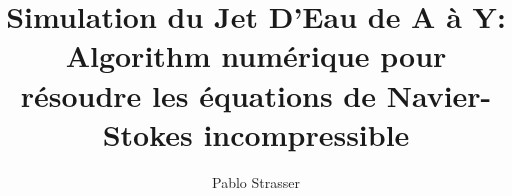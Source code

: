 \usepackage{amsmath,amssymb}
\usepackage{amsthm}


\usepackage{tikz}
\usepackage[francais]{babel}
\usepackage{pgfplots}
\usepackage{pgfplotstable}
\usepackage{subcaption}
%  
\usetikzlibrary{fit}
\usetikzlibrary{backgrounds}
\usetikzlibrary{positioning} 
\usetikzlibrary{shapes.multipart}
\usetikzlibrary{fit}

\newtheorem{property}{Property}

\newcommand{\vect}[1]{ {\boldsymbol {#1}}}
\newcommand{\eye}{1}
\newcommand{\kron}{\bigotimes}

 \beamerdefaultoverlayspecification{<+->}

\newenvironment{plusenv}{\alt{\setbeamertemplate{itemize item}{$\textcolor{green}{\oplus}$}}
{\setbeamertemplate{itemize item}{$\textcolor{gray}{\oplus}$}}}{}
\newenvironment{moinsenv}{\alt{\setbeamertemplate{itemize item}{$\textcolor{red}{\ominus}$}}
{\setbeamertemplate{itemize item}{$\textcolor{gray}{\ominus}$}}}{}
\def\plusitem{\item<+-| plus@+-| handout:plus@0-> }
\def\moinsitem{\item<+-| moins@+-| handout:moins@0-> }

\newenvironment{pmenv}{\alt{\setbeamertemplate{itemize item}{$\textcolor{blue}{\pm}$}}
{\setbeamertemplate{itemize item}{$\textcolor{gray}{\pm}$}}}{}
\def\pmitem{\item<+-| pm@+-| handout:pm@0-> }



\pgfplotsset{compat=1.6}

\title[Navier-Stokes]{Simulation du Jet D'Eau de A à Y:\\ Algorithm numérique pour résoudre les équations de Navier-Stokes incompressible}


\author{Pablo Strasser}






